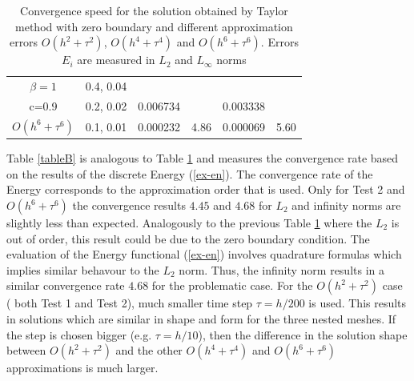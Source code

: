 \documentclass[%
 aip,
cp,  %
 amsmath,amssymb,%
 reprint,%
]{revtex4-2}
\newcommand{\rf}[1]{(\ref{#1})}
\begin{document}
\begin{table}[ht]
\begin{tabular}{||c|l|ll|ll||}
    \hline
  $\beta=1$     &0.4, 0.04   &            &          &                  &      \\
      c=0.9                    &0.2, 0.02   &0.006734 &           & 0.003338      &       \\
     $O(h^6+ \tau^6)$ &0.1, 0.01 & 0.000232 &4.86 & 0.000069  & 5.60        \\
	   \hline
			\hline 
		\end{tabular}
		\caption{Convergence speed for the solution obtained by Taylor method with zero boundary and different approximation errors $O(h^{2} + \tau^2 )$, $O(h^{4} + \tau^4 )$ and $O(h^{6} + \tau^6 )$. Errors $E_i$ are measured in $L_2$ and $L_\infty$ norms}
\label{tableA}
\end{table}

Table \ref{tableB} is analogous to Table \ref{tableA} and measures the convergence rate based on the results of the discrete Energy \rf{ex-en}. The convergence rate of the Energy corresponds to the approximation order that is used. Only for Test 2 and $O(h^6 + \tau^6)$ the convergence results $4.45$ and $4.68$ for $L_2$ and infinity norms are slightly less than expected. Analogously to the previous Table \ref{tableA} where the $L_2$ is out of order, this result could be due to the zero boundary condition. The evaluation of the Energy functional \rf{ex-en} involves quadrature formulas which implies similar behavour to the $L_2$ norm. Thus, the infinity norm results in a similar convergence rate $4.68$ for the problematic case.
For the $O(h^2 + \tau^2)$ case ( both Test 1 and Test 2), much smaller time step  $\tau = h/200$ is used. This results in solutions which are similar in shape and form for the three nested meshes. If the step is chosen bigger (e.g. $\tau = h/10$), then the difference in the solution shape between $O(h^2 + \tau^2)$ and the other $O(h^4 + \tau^4)$ and $O(h^6 + \tau^6)$ approximations is much larger. 
\end{document}
